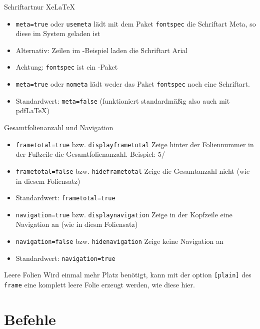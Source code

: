 \documentclass[german,10pt,xcolor=colortbl,compress
]{beamer}
\begin{document}
	\begin{frame}{Schriftart}{nur XeLaTeX}
		\begin{itemize}
			\item \lstinline|meta=true| oder \lstinline|usemeta| lädt mit dem Paket \lstinline|fontspec| die Schriftart Meta, so diese im System geladen ist
			\item Alternativ: Zeilen im \XeLaTeX-Beispiel laden die Schriftart Arial
			\item Achtung: \lstinline|fontspec| ist ein \XeLaTeX-Paket
			\item \lstinline|meta=true| oder \lstinline|nometa| lädt weder das Paket \lstinline|fontspec| noch eine Schriftart.
			\item Standardwert: \lstinline|meta=false| (funktioniert standardmäßig also auch mit pdf\LaTeX)
		\end{itemize}
	\end{frame}
	\begin{frame}{Gesamtfolienanzahl und Navigation}
		\begin{itemize}
			\item \lstinline|frametotal=true| bzw. \lstinline|displayframetotal| Zeige hinter der Foliennummer in der Fußzeile die Gesamtfolienanzahl. Beispiel: 5/\inserttotalframenumber
			\item \lstinline|frametotal=false| bzw. \lstinline|hideframetotal| Zeige die Gesamtanzahl nicht (wie in diesem Foliensatz)
			\item Standardwert: \lstinline|frametotal=true|
		\end{itemize}
		\vspace{\baselineskip}
		\begin{itemize}
			\item \lstinline|navigation=true| bzw. \lstinline|displaynavigation| Zeige in der Kopfzeile eine Navigation an (wie in diesm Foliensatz)
			\item \lstinline|navigation=false| bzw. \lstinline|hidenavigation| Zeige keine Navigation an
			\item Standardwert: \lstinline|navigation=true|
		\end{itemize}
	\end{frame}
	\begin{frame}[plain]{Leere Folien}
		Wird einmal mehr Platz benötigt, kann mit der option \lstinline|[plain]| des \lstinline|frame| eine komplett leere Folie erzeugt werden, wie diese hier.
	\end{frame}
	\section{Befehle}
\end{document}

